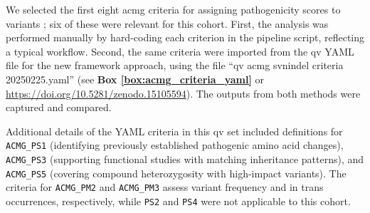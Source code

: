 We selected the first eight \ac{acmg} criteria for assigning pathogenicity scores to variants \cite{richards2015standards}; six of these were relevant for this cohort. First, the analysis was performed manually by hard-coding each criterion in the pipeline script, reflecting a typical workflow. Second, the same criteria were imported from the \ac{qv} YAML file for the new framework approach, using the file ``qv acmg svnindel criteria 20250225.yaml'' (see \textbf{Box \ref{box:acmg_criteria_yaml}} or \url{https://doi.org/10.5281/zenodo.15105594}).
The outputs from both methods were captured and compared.

Additional details of the YAML criteria in this \ac{qv} set included definitions for \texttt{ACMG\_PS1} (identifying previously established pathogenic amino acid changes), \texttt{ACMG\_PS3} (supporting functional studies with matching inheritance patterns), and \texttt{ACMG\_PS5} (covering compound heterozygosity with high-impact variants). The criteria for \texttt{ACMG\_PM2} and \texttt{ACMG\_PM3} assess variant frequency and in trans occurrences, respectively, while \texttt{PS2} and \texttt{PS4} were not applicable to this cohort.


% 

